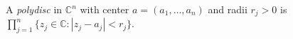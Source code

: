 
A \emph{polydisc} in $\mathbb C^n$ with center $a=(a_1,\dots,a_n)$ and radii $r_j>0$ is $\prod_{j=1}^n\{z_j\in\mathbb C:|z_j-a_j|<r_j\}$.
